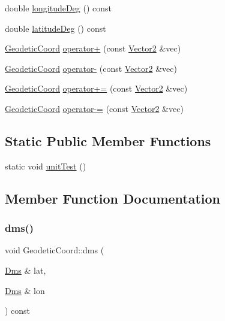 \begin{DoxyCompactItemize}
\item 
double \mbox{\hyperlink{class_m210_1_1_geodetic_coord_a015d828931c1e3bb05de39bdbe415af9}{longitude\+Deg}} () const
\item 
double \mbox{\hyperlink{class_m210_1_1_geodetic_coord_ad5ade40ea0085e303396ffaec259aec7}{latitude\+Deg}} () const
\item 
\mbox{\hyperlink{class_m210_1_1_geodetic_coord}{Geodetic\+Coord}} \mbox{\hyperlink{class_m210_1_1_geodetic_coord_a763b712e1d458ba213f03bc4f45c1862}{operator+}} (const \mbox{\hyperlink{struct_vector2}{Vector2}} \&vec)
\item 
\mbox{\hyperlink{class_m210_1_1_geodetic_coord}{Geodetic\+Coord}} \mbox{\hyperlink{class_m210_1_1_geodetic_coord_ab3e11a59306f739faedd8be52472d2c4}{operator-\/}} (const \mbox{\hyperlink{struct_vector2}{Vector2}} \&vec)
\item 
\mbox{\hyperlink{class_m210_1_1_geodetic_coord}{Geodetic\+Coord}} \mbox{\hyperlink{class_m210_1_1_geodetic_coord_acf1d0b551179adc795b70a6d17d16fe2}{operator+=}} (const \mbox{\hyperlink{struct_vector2}{Vector2}} \&vec)
\item 
\mbox{\hyperlink{class_m210_1_1_geodetic_coord}{Geodetic\+Coord}} \mbox{\hyperlink{class_m210_1_1_geodetic_coord_ab73b337cbae14719e288ad88dcfdefd4}{operator-\/=}} (const \mbox{\hyperlink{struct_vector2}{Vector2}} \&vec)
\end{DoxyCompactItemize}
\subsection*{Static Public Member Functions}
\begin{DoxyCompactItemize}
\item 
static void \mbox{\hyperlink{class_m210_1_1_geodetic_coord_ab3ec669f7868af7901701dc6a615147e}{unit\+Test}} ()
\end{DoxyCompactItemize}


\subsection{Member Function Documentation}
\mbox{\label{class_m210_1_1_geodetic_coord_a91f14ba9099dba8ea3b6044d74663525}} 
\subsubsection{\texorpdfstring{dms()}{dms()}}
{\footnotesize\ttfamily void Geodetic\+Coord\+::dms (\begin{DoxyParamCaption}\item[{\mbox{\hyperlink{struct_m210_1_1_dms}{Dms}} \&}]{lat,  }\item[{\mbox{\hyperlink{struct_m210_1_1_dms}{Dms}} \&}]{lon }\end{DoxyParamCaption}) const}

